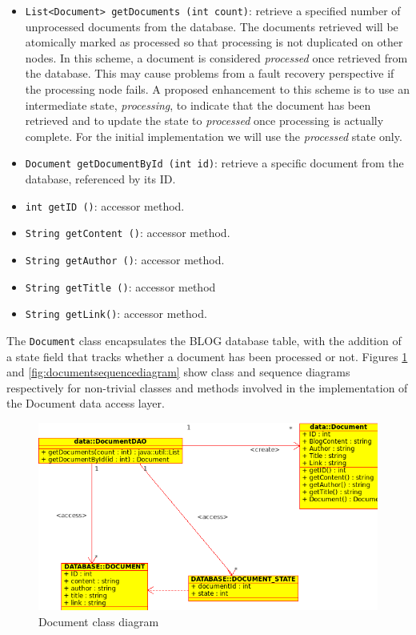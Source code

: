 \documentclass[10pt]{report}
\begin{document}
\begin{itemize}
\item \texttt{List<Document> getDocuments (int count)}: retrieve a
  specified number of unprocessed documents from the database. The
  documents retrieved will be atomically marked as processed so that
  processing is not duplicated on other nodes. In this scheme, a
  document is considered \textit{processed} once retrieved from the
  database. This may cause problems from a fault recovery perspective
  if the processing node fails. A proposed enhancement to this scheme
  is to use an intermediate state, \textit{processing}, to indicate
  that the document has been retrieved and to update the state to
  \textit{processed} once processing is actually complete. For the
  initial implementation we will use the \textit{processed} state
  only.

\item \texttt{Document getDocumentById (int id)}: retrieve a specific
  document from the database, referenced by its ID. 

\item \texttt{int getID ()}: accessor method.
\item \texttt{String getContent ()}: accessor method.
\item \texttt{String getAuthor ()}: accessor method.
\item \texttt{String getTitle ()}: accessor method
\item \texttt{String getLink()}: accessor method.
\end{itemize}

The \texttt{Document} class encapsulates the BLOG database table, with the
addition of a state field that tracks whether a document has been
processed or not. Figures \ref{fig:documentclassdiagram} and
\ref{fig:documentsequencediagram} show class and sequence diagrams
respectively for non-trivial classes and methods involved in the
implementation of the Document data access layer. 

\begin{figure}
  \begin{center}
        \includegraphics[width=\textwidth,height=!]{documentclassdiagram}
  \end{center}
  \caption{Document class diagram}
  \label{fig:documentclassdiagram}
\end{figure} 
\end{document}
